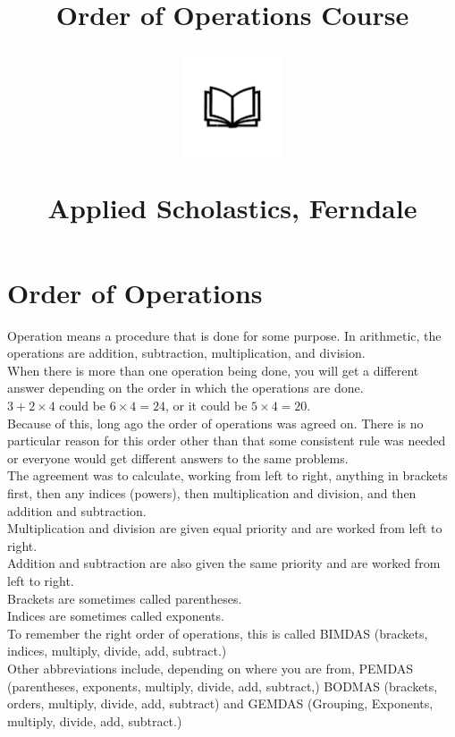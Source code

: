 \documentclass[12pt]{article}
\title{Order of Operations Course\\
\begin{center}
\includegraphics[width=4em]{ApS_logo.png}
\end{center}
\begin{normalsize}Applied Scholastics, Ferndale \end{normalsize}}
\author{}
\date{}
\begin{document}
\maketitle

\section*{Order of Operations}

Operation means a procedure that is done for some purpose. In arithmetic, the operations are addition, subtraction, multiplication, and division.\\

When there is more than one operation being done, you will get a different answer depending on the order in which the operations are done.\\

$3 + 2 \times 4$ could be $6 \times 4 = 24$, or it could be $5 \times 4 = 20$.\\

Because of this, long ago the order of operations was agreed on. There is no particular reason for this order other than that some consistent rule was needed or everyone would get different answers to the same problems.\\

The agreement was to calculate, working from left to right,  anything in brackets first, then any indices (powers), then multiplication and division, and then addition and subtraction.\\

Multiplication and division are given equal priority and are worked from left to right.\\

Addition and subtraction are also given the same priority and are worked from left to right.\\

Brackets are sometimes called parentheses.\\

Indices are sometimes called exponents.\\

To remember the right order of operations, this is called BIMDAS (brackets, indices, multiply, divide, add, subtract.)\\

Other abbreviations include, depending on where you are from, PEMDAS (parentheses, exponents, multiply, divide, add, subtract,) BODMAS (brackets, orders, multiply, divide, add, subtract) and GEMDAS (Grouping, Exponents, multiply, divide, add, subtract.)
\end{document}
